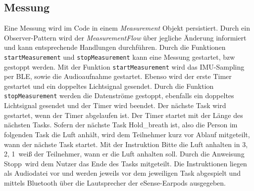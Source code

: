 \subsection{Messung}
\label{ch:Implementierung:app:measurement}
Eine Messung wird im Code in einem \textit{Measurement} Objekt persistiert.
Durch ein Observer-Pattern wird der \textit{MeasurementFlow} über jegliche Änderung informiert und kann entsprechende Handlungen durchführen.
Durch die Funktionen \texttt{startMeasurement} und \texttt{stopMeasurement} kann eine Messung gestartet, bzw gestoppt werden.
Mit der Funktion \texttt{startMeasurement} wird das IMU-Sampling per BLE, sowie die Audioaufnahme gestartet. 
Ebenso wird der erste Timer gestartet und ein doppeltes Lichtsignal gesendet. 
Durch die Funktion \texttt{stopMeasurement} werden die Datenströme gestoppt, ebenfalls ein doppeltes Lichtsignal gesendet und der Timer wird beendet.
Der nächste Task wird gestartet, wenn der Timer abgelaufen ist. Der Timer startet mit der Länge des nächsten Tasks.
Sofern der nächste Task {\glqq Hold\_breath\grqq} ist, also die Person im folgenden Task die Luft anhält, wird dem Teilnehmer kurz vor Ablauf mitgeteilt, wann der nächste Task startet.
Mit der Instruktion \glqq Bitte die Luft anhalten in 3, 2, 1\grqq \ weiß der Teilnehmer, wann er die Luft anhalten soll.
Durch die Anweisung \glqq Stopp\grqq \ wird dem Nutzer das Ende des Tasks mitgeteilt. 
Die Instruktionen liegen als Audiodatei vor und werden jeweils vor dem jeweiligen Task abgespielt und mittels Bluetooth über die Lautsprecher der eSense-Earpods ausgegeben.


